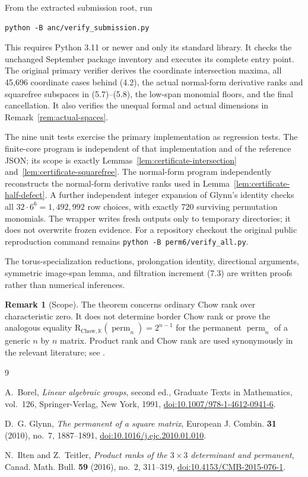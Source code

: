 \documentclass[11pt]{amsart}
\newcommand{\K}{\mathbb{K}}
\newcommand{\perm}{\operatorname{perm}}
\theoremstyle{definition}
\newtheorem{remark}[theorem]{Remark}
\begin{document}
From the extracted submission root, run
\begin{verbatim}
python -B anc/verify_submission.py
\end{verbatim}
This requires Python 3.11 or newer and only its standard library. It checks
the unchanged September package inventory and executes its complete
 entry point. The original primary
verifier derives the coordinate intersection maxima, all 45,696
coordinate cases behind (4.2), the actual normal-form derivative ranks and
squarefree subspaces in (5.7)--(5.8), the low-span monomial floors, and the
final cancellation. It also verifies the unequal formal and actual dimensions
in Remark~\ref{rem:actual-spaces}.

The nine unit tests exercise the primary implementation as regression tests.
The finite-core program is independent of that implementation and of the reference JSON;
its scope is exactly Lemmas~\ref{lem:certificate-intersection}
and~\ref{lem:certificate-squarefree}. The normal-form program independently
reconstructs the normal-form derivative ranks used in
Lemma~\ref{lem:certificate-half-defect}. A further independent integer
expansion of Glynn's identity checks all \(32\cdot6^6=1{,}492{,}992\)
row choices, with exactly \(720\) surviving permutation monomials.
The wrapper writes fresh outputs only to temporary directories; it does
not overwrite frozen evidence. For a repository checkout the original
public reproduction command remains \verb|python -B perm6/verify_all.py|.

The torus-specialization reductions, prolongation identity, directional
arguments, symmetric image-span lemma, and filtration increment (7.3) are
written proofs rather than numerical inferences.

\begin{remark}[Scope]
The theorem concerns ordinary Chow rank over characteristic zero. It does not
determine border Chow rank or prove the analogous equality
\(\mathrm{R}_{\mathrm{Chow},\K}(\perm_n)=2^{n-1}\) for the permanent
\(\perm_n\) of a generic \(n\) by \(n\) matrix. Product rank and Chow rank are
used synonymously in the relevant
literature; see \cite{IltenTeitler2016}.
\end{remark}

\begin{thebibliography}{9}

A.~Borel,
\emph{Linear algebraic groups}, second ed., Graduate Texts in Mathematics,
vol.~126, Springer-Verlag, New York, 1991,
\href{https://doi.org/10.1007/978-1-4612-0941-6}
{doi:10.1007/978-1-4612-0941-6}.

D.~G. Glynn,
\emph{The permanent of a square matrix},
European J. Combin. \textbf{31} (2010), no.~7, 1887--1891,
\href{https://doi.org/10.1016/j.ejc.2010.01.010}
{doi:10.1016/j.ejc.2010.01.010}.

N.~Ilten and Z.~Teitler,
\emph{Product ranks of the \(3\times3\) determinant and permanent},
Canad. Math. Bull. \textbf{59} (2016), no.~2, 311--319,
\href{https://doi.org/10.4153/CMB-2015-076-1}
{doi:10.4153/CMB-2015-076-1}.

\end{thebibliography}
\end{document}
